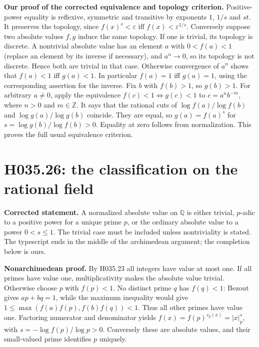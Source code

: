 \textbf{Our proof of the corrected equivalence and topology criterion.}
Positive-power equality is reflexive, symmetric and transitive by
exponents $1$, $1/s$ and $st$. It preserves the topology, since
$f(x)^s<\varepsilon$ iff $f(x)<\varepsilon^{1/s}$.
Conversely suppose two absolute values $f,g$ induce the same topology.
If one is trivial, its topology is discrete. A nontrivial absolute
value has an element $a$ with $0<f(a)<1$ (replace an element by its
inverse if necessary), and $a^n\to0$, so its topology is not discrete.
Hence both are trivial in that case. Otherwise convergence of $a^n$
shows that $f(a)<1$ iff $g(a)<1$. In particular $f(a)=1$ iff
$g(a)=1$, using the corresponding assertion for the inverse.
Fix $b$ with $f(b)>1$, so $g(b)>1$. For arbitrary $a\ne0$, apply
the equivalence $f(c)<1\Leftrightarrow g(c)<1$ to $c=a^n b^{-m}$,
where $n>0$ and $m\in\mathbb Z$. It says that the rational cuts
of $\log f(a)/\log f(b)$ and $\log g(a)/\log g(b)$ coincide.
They are equal, so $g(a)=f(a)^s$ for
$s=\log g(b)/\log f(b)>0$. Equality at zero follows from
normalization. This proves the full usual equivalence criterion.

\section{H035.26: the classification on the rational field}
\textbf{Corrected statement.} A normalized absolute value on
$\mathbb Q$ is either trivial, $p$-adic to a positive power for a
unique prime $p$, or the ordinary absolute value to a power
$0<s\leq1$. The trivial case must be included unless nontriviality
is stated. The typescript ends in the middle of the archimedean
argument; the completion below is ours.

\textbf{Nonarchimedean proof.} By H035.23 all integers have value at
most one. If all primes have value one, multiplicativity makes the
absolute value trivial. Otherwise choose $p$ with $f(p)<1$. No
distinct prime $q$ has $f(q)<1$: Bezout gives $ap+bq=1$, while the
maximum inequality would give
$1\leq\max(f(a)f(p),f(b)f(q))<1$. Thus all other primes have
value one. Factoring numerator and denominator yields
$f(x)=f(p)^{v_p(x)}=|x|_p^s$, with
$s=-\log f(p)/\log p>0$. Conversely these are absolute values,
and their small-valued prime identifies $p$ uniquely.


